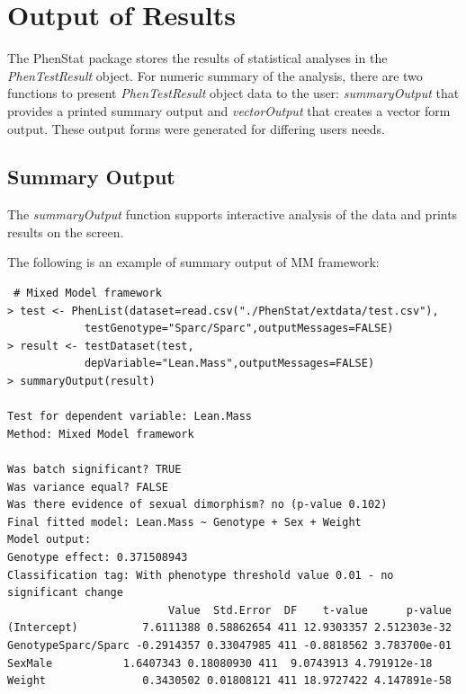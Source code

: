 \documentclass[12pt,a4paper]{article}
\begin{document}
\section{Output of Results}
\label{section:Results}
The PhenStat package stores the results of statistical analyses in the \textit{PhenTestResult} object.  
For numeric summary of the analysis, there are two functions to present \textit{PhenTestResult} object data to the user: 
\textit{summaryOutput} that provides a printed summary output and \textit{vectorOutput} that creates a vector form output. 
These output forms were generated for differing users needs. 

\subsection{Summary Output}
\label{SummaryOutput}
The \textit{summaryOutput} function supports interactive analysis of the data and prints results on the screen.

The following is an example of summary output of MM framework:
\begingroup
    \fontsize{8pt}{12pt}\selectfont
\begin{verbatim}
 # Mixed Model framework
> test <- PhenList(dataset=read.csv("./PhenStat/extdata/test.csv"),
            testGenotype="Sparc/Sparc",outputMessages=FALSE)
> result <- testDataset(test,
            depVariable="Lean.Mass",outputMessages=FALSE)
> summaryOutput(result)

Test for dependent variable: Lean.Mass
Method: Mixed Model framework

Was batch significant? TRUE
Was variance equal? FALSE
Was there evidence of sexual dimorphism? no (p-value 0.102)
Final fitted model: Lean.Mass ~ Genotype + Sex + Weight
Model output:
Genotype effect: 0.371508943
Classification tag: With phenotype threshold value 0.01 - no significant change
                         Value  Std.Error  DF    t-value      p-value
(Intercept)          7.6111388 0.58862654 411 12.9303357 2.512303e-32
GenotypeSparc/Sparc -0.2914357 0.33047985 411 -0.8818562 3.783700e-01
SexMale           1.6407343 0.18080930 411  9.0743913 4.791912e-18
Weight               0.3430502 0.01808121 411 18.9727422 4.147891e-58
\end{verbatim}
\endgroup
\end{document}
